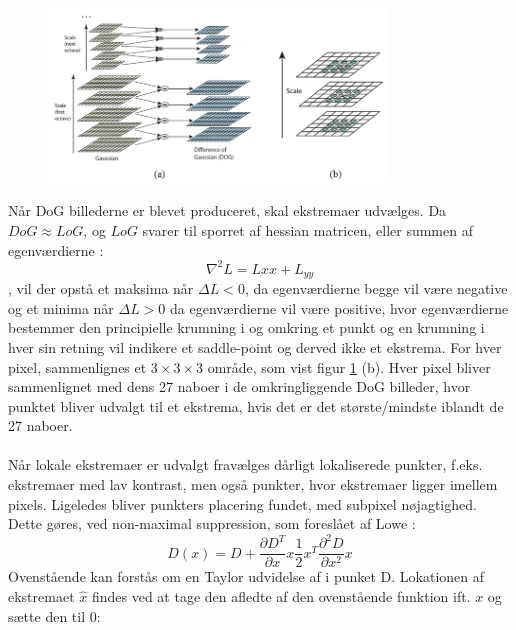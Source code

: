 \begin{figure}[H]
    \centering
    \includegraphics[width=0.80\textwidth]{fig/30.png}
     \vspace{-1em}
    \begin{center}    
       \caption{\textcolor{gray}{\footnotesize \textit{ }}}
    \label{fig:difference}
     \end{center}
     \vspace{-2.5em}
  \end{figure} \noindent
Når DoG billederne er blevet produceret, skal ekstremaer udvælges. Da $DoG \approx LoG$, og $LoG$ svarer til sporret af hessian matricen, eller summen af egenværdierne :$$\nabla^2 L = L{xx}+L_{yy} $$, vil der opstå et maksima når $\Delta L<0$, da egenværdierne begge vil være negative og et minima når $\Delta L > 0$ da egenværdierne vil være positive, hvor egenværdierne bestemmer den principielle krumning i og omkring et punkt og en krumning i hver sin retning vil indikere et saddle-point og derved ikke et ekstrema.
For hver pixel, sammenlignes et $3\times3\times3$ område, som vist figur \ref{fig:difference} (b). Hver pixel bliver sammenlignet med dens 27 naboer i de omkringliggende DoG billeder, hvor punktet bliver udvalgt til et ekstrema, hvis det er det største/mindste iblandt de 27 naboer.
\\
\\
Når lokale ekstremaer er udvalgt fravælges dårligt lokaliserede punkter, f.eks. ekstremaer med lav kontrast, men også punkter, hvor ekstremaer ligger imellem pixels. Ligeledes bliver punkters placering fundet, med subpixel nøjagtighed. Dette gøres, ved non-maximal suppression, som foreslået af Lowe \cite{nonmaximalsuppression}:
\begin{equation}
D(x)=D+\dfrac{\partial D^T}{\partial x}x\dfrac{1}{2}x^T\dfrac{\partial^2D}{\partial x^2}x
\label{nonmax}
\end{equation}
Ovenstående kan forstås om en Taylor udvidelse af i punket D.
Lokationen af ekstremaet $\hat{x}$ findes ved at tage den afledte af den ovenstående funktion ift. $x$ og sætte den til 0:
